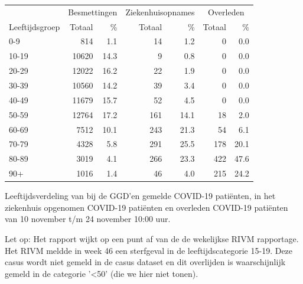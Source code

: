 \documentclass[
  english,
  man,floatsintext]{apa6}
\begin{document}
\begin{table}[H]
\centering\begingroup\fontsize{11}{13}\selectfont

\begin{threeparttable}
\begin{tabular}{lrrrrrr}
\toprule
\multicolumn{1}{c}{ } & \multicolumn{2}{c}{Besmettingen} & \multicolumn{2}{c}{Ziekenhuisopnames} & \multicolumn{2}{c}{Overleden} \\
\cmidrule(l{3pt}r{3pt}){2-3} \cmidrule(l{3pt}r{3pt}){4-5} \cmidrule(l{3pt}r{3pt}){6-7}
Leeftijdsgroep & Totaal & \% & Totaal & \% & Totaal & \%\\
\midrule
0-9 & 814 & 1.1 & 14 & 1.2 & 0 & 0.0\\
10-19 & 10620 & 14.3 & 9 & 0.8 & 0 & 0.0\\
20-29 & 12022 & 16.2 & 22 & 1.9 & 0 & 0.0\\
30-39 & 10560 & 14.2 & 39 & 3.4 & 0 & 0.0\\
40-49 & 11679 & 15.7 & 52 & 4.5 & 0 & 0.0\\
50-59 & 12764 & 17.2 & 161 & 14.1 & 18 & 2.0\\
60-69 & 7512 & 10.1 & 243 & 21.3 & 54 & 6.1\\
70-79 & 4328 & 5.8 & 291 & 25.5 & 178 & 20.1\\
80-89 & 3019 & 4.1 & 266 & 23.3 & 422 & 47.6\\
90+ & 1016 & 1.4 & 46 & 4.0 & 215 & 24.2\\
\bottomrule
\end{tabular}
\begin{tablenotes}
\item[1] Leeftijdsverdeling van bij de GGD’en gemelde COVID-19 patiënten, in het ziekenhuis opgenomen COVID-19 patiënten en overleden COVID-19 patiënten van 10 november t/m 24 november 10:00 uur.
\item[2] Let op: Het rapport wijkt op een punt af van de de wekelijkse RIVM rapportage. Het RIVM meldde in week 46 een sterfgeval in de leeftijdscategorie 15-19. Deze casus wordt niet gemeld in de casus dataset en dit overlijden is waarschijnlijk gemeld in de categorie '<50' (die we hier niet tonen).
\end{tablenotes}
\end{threeparttable}
\endgroup{}
\end{table}

\newpage
\end{document}
